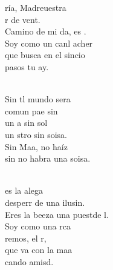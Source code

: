 \documentclass[12pt]{article}
\begin{document}
\begin{multicols*}{2}
\begin{cancion}%
	ría, Madreuestra\\
	r de vent.\\
	Camino de mi da,  es . \\
	Soy como un canl acher\\
	que busca en el sincio\\
	 pasos  tu ay. \\\jump\\
	\begin{chorus}%
	Sin tl mundo sera\\
	comun pae sin \\
	un a sin sol\\
	un stro sin soisa.\\
	Sin Maa, no haíz\\
	sin no habra una soisa.\\
	\end{chorus}%
	\jump\\
	es la alega \\
	desperr de una ilusin.\\
	Eres la beeza una puestde l.\\
\jump
	Soy como una rca\\
	 remos,  el r,\\
	que va con la maa\\
	cando  amisd.\\
\end{cancion}%


\end{multicols*}
\end{document}
